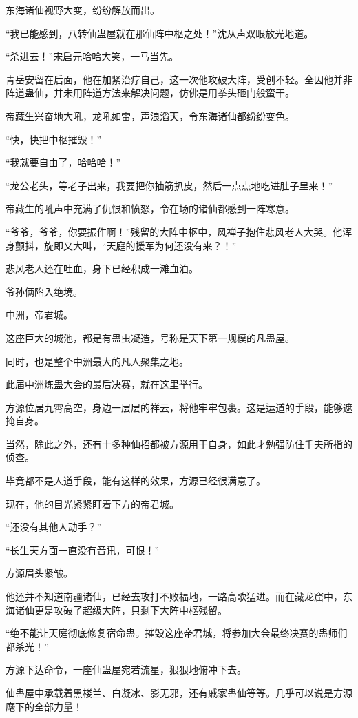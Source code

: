 \begin{this_body}
东海诸仙视野大变，纷纷解放而出。

“我已能感到，八转仙蛊屋就在那仙阵中枢之处！”沈从声双眼放光地道。

“杀进去！”宋启元哈哈大笑，一马当先。

青岳安留在后面，他在加紧治疗自己，这一次他攻破大阵，受创不轻。全因他并非阵道蛊仙，并未用阵道方法来解决问题，仿佛是用拳头砸门般蛮干。

帝藏生兴奋地大吼，龙吼如雷，声浪滔天，令东海诸仙都纷纷变色。

“快，快把中枢摧毁！”

“我就要自由了，哈哈哈！”

“龙公老头，等老子出来，我要把你抽筋扒皮，然后一点点地吃进肚子里来！”

帝藏生的吼声中充满了仇恨和愤怒，令在场的诸仙都感到一阵寒意。

“爷爷，爷爷，你要振作啊！”残留的大阵中枢中，风禅子抱住悲风老人大哭。他浑身颤抖，旋即又大叫，“天庭的援军为何还没有来？！”

悲风老人还在吐血，身下已经积成一滩血泊。

爷孙俩陷入绝境。

中洲，帝君城。

这座巨大的城池，都是有蛊虫凝造，号称是天下第一规模的凡蛊屋。

同时，也是整个中洲最大的凡人聚集之地。

此届中洲炼蛊大会的最后决赛，就在这里举行。

方源位居九霄高空，身边一层层的祥云，将他牢牢包裹。这是运道的手段，能够遮掩自身。

当然，除此之外，还有十多种仙招都被方源用于自身，如此才勉强防住千夫所指的侦查。

毕竟都不是人道手段，能有这样的效果，方源已经很满意了。

现在，他的目光紧紧盯着下方的帝君城。

“还没有其他人动手？”

“长生天方面一直没有音讯，可恨！”

方源眉头紧皱。

他还并不知道南疆诸仙，已经去攻打不败福地，一路高歌猛进。而在藏龙窟中，东海诸仙更是攻破了超级大阵，只剩下大阵中枢残留。

“绝不能让天庭彻底修复宿命蛊。摧毁这座帝君城，将参加大会最终决赛的蛊师们都杀光！”

方源下达命令，一座仙蛊屋宛若流星，狠狠地俯冲下去。

仙蛊屋中承载着黑楼兰、白凝冰、影无邪，还有戚家蛊仙等等。几乎可以说是方源麾下的全部力量！


\end{this_body}
